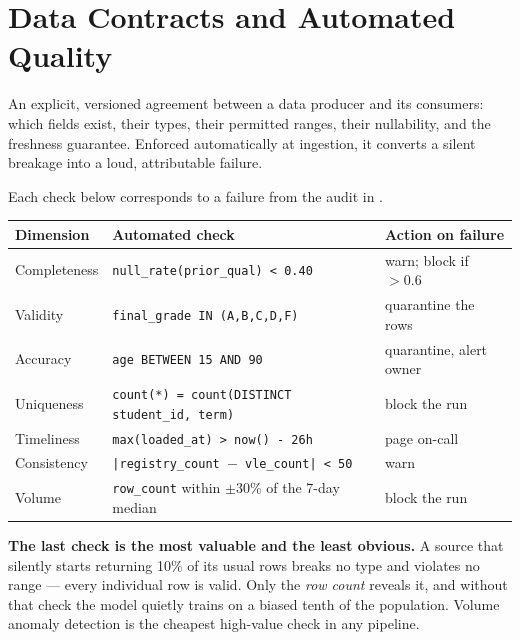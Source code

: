 \section{Data Contracts and Automated Quality}

\begin{definitionbox}
An explicit, versioned agreement between a data producer and its consumers: which
fields exist, their types, their permitted ranges, their nullability, and the
freshness guarantee. Enforced automatically at ingestion, it converts a silent
breakage into a loud, attributable failure.
\end{definitionbox}

\begin{worked}
Each check below corresponds to a failure from the audit in .

\smallskip
\begin{center}
\begin{tabular}{@{}L{3.5cm}L{5.2cm}L{5.0cm}@{}}
\toprule
\textbf{Dimension} & \textbf{Automated check} & \textbf{Action on failure} \\
\midrule
Completeness & \texttt{null\_rate(prior\_qual) < 0.40} & warn; block if $>0.6$ \\
Validity & \texttt{final\_grade IN (A,B,C,D,F)} & quarantine the rows \\
Accuracy & \texttt{age BETWEEN 15 AND 90} & quarantine, alert owner \\
Uniqueness & \texttt{count(*) = count(DISTINCT student\_id, term)} & block the run \\
Timeliness & \texttt{max(loaded\_at) > now() - 26h} & page on-call \\
Consistency & \texttt{|registry\_count $-$ vle\_count| < 50} & warn \\
Volume & \texttt{row\_count} within $\pm30\%$ of the 7-day median & block the run \\
\bottomrule
\end{tabular}
\end{center}

\smallskip
\textbf{The last check is the most valuable and the least obvious.} A source that
silently starts returning 10\% of its usual rows breaks no type and violates no
range --- every individual row is valid. Only the \emph{row count} reveals it, and
without that check the model quietly trains on a biased tenth of the population.
Volume anomaly detection is the cheapest high-value check in any pipeline.
\end{worked}

